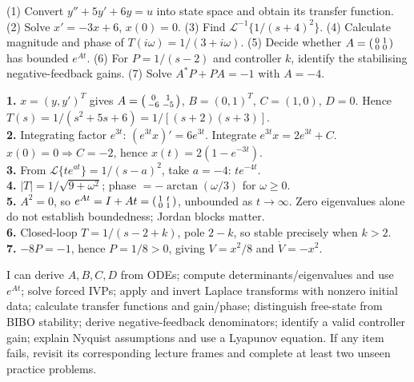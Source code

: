 \documentclass[10pt,a4paper]{article}
\newcommand{\Lap}{\mathcal{L}}\newcommand{\CC}{\mathbb{C}}\newcommand{\RR}{\mathbb{R}}
\begin{document}
\begin{defbox}[title={REVISION SELF-TEST: TRY BEFORE READING THE KEY}]
(1) Convert $y''+5y'+6y=u$ into state space and obtain its transfer function. (2) Solve $x'=-3x+6$, $x(0)=0$. (3) Find $\Lap^{-1}\{1/(s+4)^2\}$. (4) Calculate magnitude and phase of $T(i\omega)=1/(3+i\omega)$. (5) Decide whether $A=\begin{psmallmatrix}0&1\\0&0\end{psmallmatrix}$ has bounded $e^{At}$. (6) For $P=1/(s-2)$ and controller $k$, identify the stabilising negative-feedback gains. (7) Solve $A^*P+PA=-1$ with $A=-4$.
\end{defbox}
\begin{workbox}[title={FULLY WORKED SELF-TEST ANSWERS}]
\textbf{1.} $x=(y,y')^T$ gives $A=\begin{psmallmatrix}0&1\\-6&-5\end{psmallmatrix}$, $B=(0,1)^T$, $C=(1,0)$, $D=0$. Hence $T(s)=1/(s^2+5s+6)=1/[(s+2)(s+3)]$.\\
\textbf{2.} Integrating factor $e^{3t}$: $(e^{3t}x)'=6e^{3t}$. Integrate $e^{3t}x=2e^{3t}+C$. $x(0)=0\Rightarrow C=-2$, hence $x(t)=2(1-e^{-3t})$.\\
\textbf{3.} From $\Lap\{te^{at}\}=1/(s-a)^2$, take $a=-4$: $te^{-4t}$.\\
\textbf{4.} $|T|=1/\sqrt{9+\omega^2}$; phase $=-\arctan(\omega/3)$ for $\omega\ge0$.\\
\textbf{5.} $A^2=0$, so $e^{At}=I+At=\begin{psmallmatrix}1&t\\0&1\end{psmallmatrix}$, unbounded as $t\to\infty$. Zero eigenvalues alone do not establish boundedness; Jordan blocks matter.\\
\textbf{6.} Closed-loop $T=1/(s-2+k)$, pole $2-k$, so stable precisely when $k>2$.\\
\textbf{7.} $-8P=-1$, hence $P=1/8>0$, giving $V=x^2/8$ and $\dot V=-x^2$.
\end{workbox}
\begin{exambox}[title={FINAL 24-HOUR REVISION CHECK}]
I can derive $A,B,C,D$ from ODEs; compute determinants/eigenvalues and use $e^{At}$; solve forced IVPs; apply and invert Laplace transforms with nonzero initial data; calculate transfer functions and gain/phase; distinguish free-state from BIBO stability; derive negative-feedback denominators; identify a valid controller gain; explain Nyquist assumptions and use a Lyapunov equation. If any item fails, revisit its corresponding lecture frames and complete at least two unseen practice problems.
\end{exambox}
\end{document}
